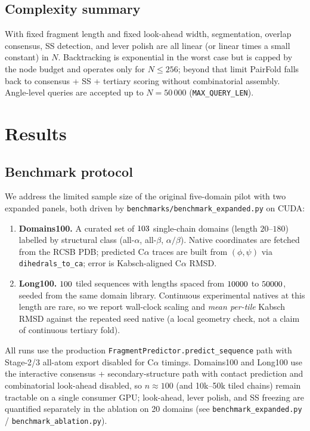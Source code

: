 \documentclass[11pt,a4paper]{article}
\begin{document}
\subsection{Complexity summary}

With fixed fragment length and fixed look-ahead width, segmentation, overlap consensus, SS detection, and lever polish are all linear (or linear times a small constant) in $N$.
Backtracking is exponential in the worst case but is capped by the node budget and operates only for $N\le 256$; beyond that limit PairFold falls back to consensus + SS + tertiary scoring without combinatorial assembly.
Angle-level queries are accepted up to $N{=}50\,000$ (\texttt{MAX\_QUERY\_LEN}).

\section{Results}

\subsection{Benchmark protocol}

We address the limited sample size of the original five-domain pilot with two expanded panels, both driven by \texttt{benchmarks/benchmark\_expanded.py} on CUDA:

\begin{enumerate}[leftmargin=1.5em,itemsep=0.35em]
  \item \textbf{Domains100.} A curated set of $103{}$ single-chain domains (length $20$--$180$) labelled by structural class (all-$\alpha$, all-$\beta$, $\alpha/\beta$).
        Native coordinates are fetched from the RCSB PDB; predicted C$\alpha$ traces are built from $(\phi,\psi)$ via \texttt{dihedrals\_to\_ca}; error is Kabsch-aligned C$\alpha$ RMSD.
  \item \textbf{Long100.} $100{}$ tiled sequences with lengths spaced from $10000{}$ to $50000{}$, seeded from the same domain library.
        Continuous experimental natives at this length are rare, so we report wall-clock scaling and \emph{mean per-tile} Kabsch RMSD against the repeated seed native (a local geometry check, not a claim of continuous tertiary fold).
\end{enumerate}

All runs use the production \texttt{FragmentPredictor.predict\_sequence} path with Stage-2/3 all-atom export disabled for C$\alpha$ timings.
Domains100 and Long100 use the interactive consensus + secondary-structure path with contact prediction and combinatorial look-ahead disabled, so $n{\approx}100$ (and 10k--50k tiled chains) remain tractable on a single consumer GPU; look-ahead, lever polish, and SS freezing are quantified separately in the ablation on 20 domains (see \texttt{benchmark\_expanded.py} / \texttt{benchmark\_ablation.py}).
\end{document}
